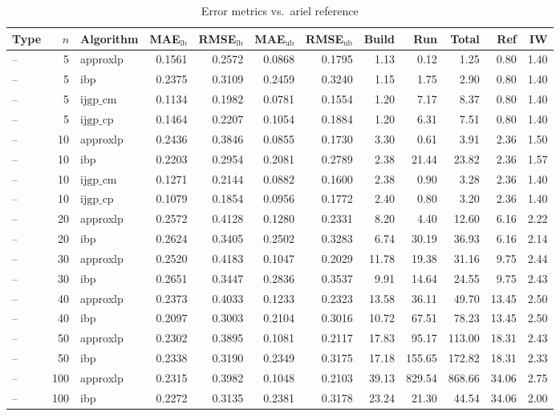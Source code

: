 \begin{table}[ht]
\centering
\scriptsize
\caption{Error metrics vs.\ ariel reference}
\begin{tabular}{lrlrrrrrrrrr}
\toprule
Type & $n$ & Algorithm & MAE$_{\text{lb}}$ & RMSE$_{\text{lb}}$ & MAE$_{\text{ub}}$ & RMSE$_{\text{ub}}$ & Build & Run & Total & Ref & IW \\
\midrule
-- & 5 & approxlp & 0.1561 & 0.2572 & 0.0868 & 0.1795 & 1.13 & 0.12 & 1.25 & 0.80 & 1.40 \\
-- & 5 & ibp & 0.2375 & 0.3109 & 0.2459 & 0.3240 & 1.15 & 1.75 & 2.90 & 0.80 & 1.40 \\
-- & 5 & $\text{ijgp\_cm}$ & 0.1134 & 0.1982 & 0.0781 & 0.1554 & 1.20 & 7.17 & 8.37 & 0.80 & 1.40 \\
-- & 5 & $\text{ijgp\_cp}$ & 0.1464 & 0.2207 & 0.1054 & 0.1884 & 1.20 & 6.31 & 7.51 & 0.80 & 1.40 \\
-- & 10 & approxlp & 0.2436 & 0.3846 & 0.0855 & 0.1730 & 3.30 & 0.61 & 3.91 & 2.36 & 1.50 \\
-- & 10 & ibp & 0.2203 & 0.2954 & 0.2081 & 0.2789 & 2.38 & 21.44 & 23.82 & 2.36 & 1.57 \\
-- & 10 & $\text{ijgp\_cm}$ & 0.1271 & 0.2144 & 0.0882 & 0.1600 & 2.38 & 0.90 & 3.28 & 2.36 & 1.40 \\
-- & 10 & $\text{ijgp\_cp}$ & 0.1079 & 0.1854 & 0.0956 & 0.1772 & 2.40 & 0.80 & 3.20 & 2.36 & 1.40 \\
-- & 20 & approxlp & 0.2572 & 0.4128 & 0.1280 & 0.2331 & 8.20 & 4.40 & 12.60 & 6.16 & 2.22 \\
-- & 20 & ibp & 0.2624 & 0.3405 & 0.2502 & 0.3283 & 6.74 & 30.19 & 36.93 & 6.16 & 2.14 \\
-- & 30 & approxlp & 0.2520 & 0.4183 & 0.1047 & 0.2029 & 11.78 & 19.38 & 31.16 & 9.75 & 2.44 \\
-- & 30 & ibp & 0.2651 & 0.3447 & 0.2836 & 0.3537 & 9.91 & 14.64 & 24.55 & 9.75 & 2.43 \\
-- & 40 & approxlp & 0.2373 & 0.4033 & 0.1233 & 0.2323 & 13.58 & 36.11 & 49.70 & 13.45 & 2.50 \\
-- & 40 & ibp & 0.2097 & 0.3003 & 0.2104 & 0.3016 & 10.72 & 67.51 & 78.23 & 13.45 & 2.50 \\
-- & 50 & approxlp & 0.2302 & 0.3895 & 0.1081 & 0.2117 & 17.83 & 95.17 & 113.00 & 18.31 & 2.43 \\
-- & 50 & ibp & 0.2338 & 0.3190 & 0.2349 & 0.3175 & 17.18 & 155.65 & 172.82 & 18.31 & 2.33 \\
-- & 100 & approxlp & 0.2315 & 0.3982 & 0.1048 & 0.2103 & 39.13 & 829.54 & 868.66 & 34.06 & 2.75 \\
-- & 100 & ibp & 0.2272 & 0.3135 & 0.2381 & 0.3178 & 23.24 & 21.30 & 44.54 & 34.06 & 2.00 \\
\bottomrule
\end{tabular}
\end{table}
